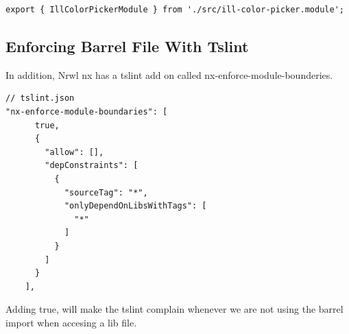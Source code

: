 \begin{lstlisting}[caption=index.ts]
export { IllColorPickerModule } from './src/ill-color-picker.module';
\end{lstlisting}

\subsection{ Enforcing Barrel File With Tslint }
In addition, Nrwl nx has a tslint add on called nx-enforce-module-bounderies.
\begin{lstlisting}
// tslint.json
"nx-enforce-module-boundaries": [
      true,
      {
        "allow": [],
        "depConstraints": [
          {
            "sourceTag": "*",
            "onlyDependOnLibsWithTags": [
              "*"
            ]
          }
        ]
      }
    ],
\end{lstlisting}

Adding true, will make the tslint complain whenever we are not using the barrel
import when accesing a lib file.

